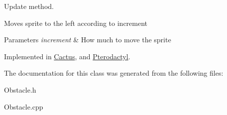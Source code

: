 Update method. 

Moves sprite to the left according to increment 
\begin{DoxyParams}{Parameters}
{\em increment} & How much to move the sprite \\
\hline
\end{DoxyParams}


Implemented in \mbox{\hyperlink{class_cactus_aa432a0a002a0027ca294813d11cb76f3}{Cactus}}, and \mbox{\hyperlink{class_pterodactyl_aab44efaf2bae744c9210d88969ed7dc7}{Pterodactyl}}.



The documentation for this class was generated from the following files\+:\begin{DoxyCompactItemize}
\item 
Obstacle.\+h\item 
Obstacle.\+cpp\end{DoxyCompactItemize}
